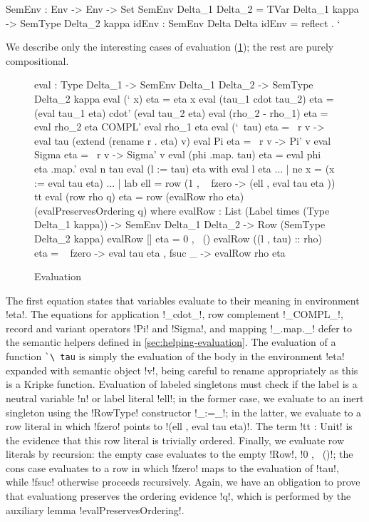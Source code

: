 \documentclass[sigplan,10pt,review]{acmart}\settopmatter{printfolios=true,printccs=false,printacmref=false}
\begin{document}
\begin{agda}
SemEnv : Env -> Env -> Set
SemEnv Delta_1  Delta_2 = TVar Delta_1 kappa -> SemType Delta_2 kappa 
idEnv : SemEnv Delta Delta
idEnv = reflect . `
\end{agda}

We describe only the interesting cases of evaluation (\cref{fig:evaluation}); the rest are purely compositional. 

\begin{figure}
\begin{agda}
eval : Type Delta_1 -> SemEnv Delta_1  Delta_2 -> SemType Delta_2  kappa
eval (` x) eta = eta x
eval (tau_1  cdot  tau_2) eta = (eval tau_1  eta) cdot' (eval tau_2  eta)
eval (rho_2 - rho_1) eta = eval rho_2 eta COMPL' eval rho_1  eta 
eval (`\ tau) eta = \ r v -> 
  eval tau (extend (rename r . eta) v)
eval Pi eta = \ r v -> Pi' v
eval Sigma eta = \ r v -> Sigma' v
eval (phi .map. tau) eta = eval phi eta .map.' eval n tau
eval (l := tau) eta with eval l eta 
... | ne x = (x := eval tau eta)
... | lab ell = row (1 , \ { fzero -> 
                            (ell , eval tau eta )}) tt
eval (row rho q) eta = row 
  (evalRow rho eta) 
  (evalPreservesOrdering q)
where
  evalRow : List (Label times (Type Delta_1 kappa)) -> 
            SemEnv Delta_1  Delta_2 -> 
            Row (SemType Delta_2 kappa)
  evalRow [] eta = 0 , \ ()
  evalRow ((l , tau) :: rho) eta = \ { fzero -> eval tau eta , 
                          fsuc _ -> evalRow rho eta }
\end{agda}
\caption{Evaluation}
\label{fig:evaluation}
\end{figure}

The first equation states that variables evaluate to their meaning in environment !eta!. The equations for application !_cdot_!, row complement !_COMPL_!, record and variant operators !Pi! and !Sigma!, and mapping !_.map._! defer to the semantic helpers defined in \cref{sec:helping-evaluation}. The evaluation of a function \lstinline{`\ tau} is simply the evaluation of the body in the environment !eta! expanded with semantic object !v!, being careful to rename appropriately as this is a Kripke function. Evaluation of labeled singletons must check if the label is a neutral variable !n! or label literal !ell!; in the former case, we evaluate to an inert singleton using the !RowType! constructor !_:=_!; in the latter, we evaluate to a row literal in which !fzero! points to !(ell , eval tau eta)!. The term !tt : Unit! is the evidence that this row literal is trivially ordered. Finally, we evaluate row literals by recursion: the empty case evaluates to the empty !Row!, !0 , \ ()!; the cons case evaluates to a row in which !fzero! maps to the evaluation of !tau!, while !fsuc! otherwise proceeds recursively. Again, we have an obligation to prove that evaluationg preserves the ordering evidence !q!, which is performed by the auxiliary lemma !evalPreservesOrdering!.
\end{document}

